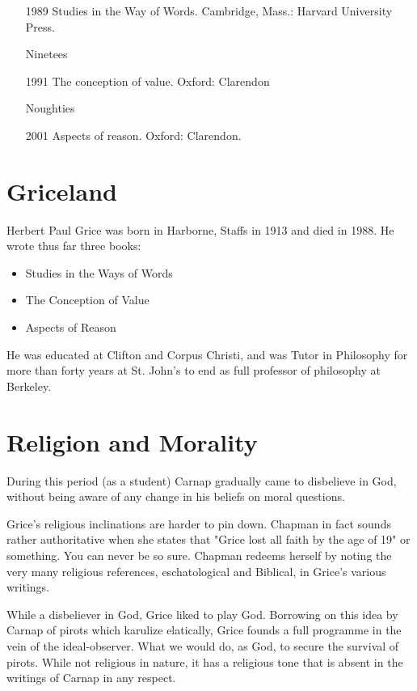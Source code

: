 \documentclass[10pt,titlepage]{book}
\begin{document}
\begin{itemize}
\item[1989] Studies in the Way of Words. Cambridge, Mass.: Harvard University
Press.

\item[Ninetees]

\item[1991] The conception of value. Oxford: Clarendon

\item[Noughties]

\item[2001] Aspects of reason. Oxford: Clarendon.

\end{itemize}

\section{Griceland}

Herbert Paul Grice was born in Harborne, Staffs 
in 1913 and died in 1988.
He wrote thus far three books:
\begin{itemize}
\item Studies in the Ways of Words \cite{grice89}
\item The Conception of Value \cite{grice91}
\item Aspects of Reason \cite{grice01}
\end{itemize}
He was educated at Clifton and Corpus Christi, 
and was Tutor in Philosophy for more than forty years at St. John's to end as full professor of philosophy at Berkeley.

\section{Religion and Morality}

During this period (as a student) Carnap gradually came to 
disbelieve in God, without being aware of any change in  his beliefs on moral questions. 

Grice's religious inclinations are harder to pin down. Chapman in  
fact sounds rather authoritative when she states that "Grice lost all faith by 
 the age of 19" or something. You can never be so sure. Chapman redeems 
herself  by noting the very many religious references, eschatological and 
Biblical, in  Grice's various writings.

While a disbeliever in God, Grice liked to play God. Borrowing on  
this idea by Carnap of pirots which karulize elatically, Grice founds a full  
programme in the vein of the ideal-observer. What we would do, as God, to 
secure  the survival of pirots. While not religious in nature, it has a 
religious tone  that is absent in the writings of Carnap in any respect.
\end{document}
